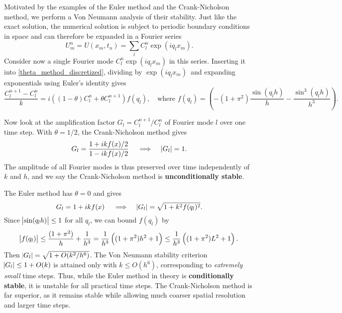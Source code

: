 Motivated by the examples of the Euler method and the Crank-Nicholson method, we perform a Von Neumann analysis of their stability.
Just like the exact solution, the numerical solution is subject to periodic boundary conditions in space and can therefore be expanded in a Fourier series
\begin{equation}
	U_m^n = U(x_m, t_n) = \sum_l C_l^n \exp \left(i q_l x_m\right).
\end{equation}
Consider now a single Fourier mode $C_l^n \exp (i q_l x_m)$ in this series.
Inserting it into \cref{theta_method_discretized}, dividing by $\exp(i q_l x_m)$ and expanding exponentials using Euler's identity gives
\begin{equation*}
\frac{C_l^{n+1}-C_l^n}{k} = i \left(\left(1-\theta\right)C_l^n+\theta C_l^{n+1}\right) f(q_l) , \quad \text{where} \,\, f(q_l) = \left(-\left(1+\pi^2\right) \frac{\sin(q_l h)}{h} - \frac{\sin^3(q_l h)}{h^3}\right).
\end{equation*}

Now look at the amplification factor $G_l = C_l^{n+1} / C_l^n$ of Fourier mode $l$ over one time step. 
With $\theta = 1/2$, the Crank-Nicholson method gives 
\begin{equation}
	G_l = \frac{1 + i k f(x) / 2}{1 - i k f(x) / 2} \quad \implies \quad \abs{G_l} = 1.
	\label{crank_nicholson_amplification_factor}
\end{equation}
The amplitude of all Fourier modes is thus preserved over time independently of $k$ and $h$, and we say the Crank-Nicholson method is \textbf{unconditionally stable}.

The Euler method has $\theta = 0$ and gives
\begin{equation}
	G_l = 1 + i k f(x) \quad \implies \quad \abs{G_l} = \sqrt{1 + k^2 f(q_l)^2}.
	\label{euler_amplification_factor}
\end{equation}
Since $\abs{\sin(q_l h)} \leq 1$ for all $q_l$, we can bound $f(q_l)$ by
\begin{equation*}
	\abs{f(q_l)} \leq \frac{(1+\pi^2)}{h} + \frac{1}{h^3} = \frac{1}{h^3} \left( (1+\pi^2) h^2 + 1 \right) \leq \frac{1}{h^3} \left( (1+\pi^2) L^2 + 1 \right).
\end{equation*}
Then $\abs{G_l} = \sqrt{1 + O(k^2 / h^6)}$.
The Von Neumann stability criterion $\abs{G_l} \leq 1 + O(k)$ \cite{owren} is attained only with $k \leq O(h^6)$, corresponding to \emph{extremely small} time steps.
Thus, while the Euler method in theory is \textbf{conditionally stable}, it is unstable for all practical time steps.
The Crank-Nicholson method is far superior, as it remains stable while allowing much coarser spatial resolution and larger time steps.

